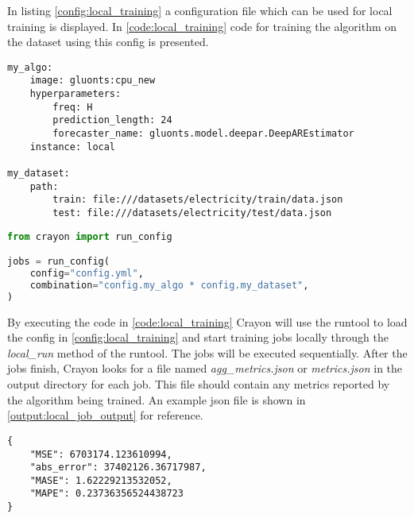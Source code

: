 In listing \ref{config:local_training} a configuration file which can be used for local training is displayed. In \ref{code:local_training} code for training the algorithm on the dataset using this config is presented. 

\begin{lstlisting}[label={config:local_training}, caption=Config file for running local training jobs]
my_algo:
    image: gluonts:cpu_new
    hyperparameters:
        freq: H
        prediction_length: 24
        forecaster_name: gluonts.model.deepar.DeepAREstimator
    instance: local

my_dataset:
    path:
        train: file:///datasets/electricity/train/data.json
        test: file:///datasets/electricity/test/data.json
\end{lstlisting}
\begin{lstlisting}[language=Python, label={code:local_training}, caption=Code for running local training jobs using Crayon]
from crayon import run_config

jobs = run_config(
    config="config.yml",
    combination="config.my_algo * config.my_dataset",
)
\end{lstlisting}

By executing the code in \ref{code:local_training} Crayon will use the runtool to load the config in \ref{config:local_training} and start training jobs locally through the \textit{local\_run} method of the runtool. The jobs will be executed sequentially. After the jobs finish, Crayon looks for a file named \textit{agg\_metrics.json} or \textit{metrics.json} in the output directory for each job. This file should contain any metrics reported by the algorithm being trained. An example json file is shown in \ref{output:local_job_output} for reference. 

\begin{lstlisting}[label={output:local_job_output}, caption=Example of a training job output file such as \textit{metrics.json} or \textit{agg\_metrics.json}]
{
    "MSE": 6703174.123610994,
    "abs_error": 37402126.36717987,
    "MASE": 1.62229213532052,
    "MAPE": 0.23736356524438723
}
\end{lstlisting}

